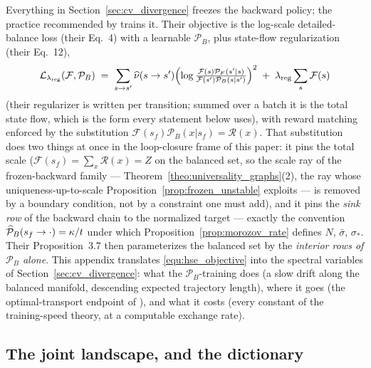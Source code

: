 \section{\appendixEtitle}\label{app:pbtrain}

Everything in Section~\ref{sec:cv_divergence} freezes the backward policy; the practice
recommended by \citet{morozov2025revisiting} trains it. Their objective is the log-scale
detailed-balance loss (their Eq.~4) with a learnable $\mathcal P_B$, plus state-flow
regularization (their Eq.~12),
\begin{equation}\label{equ:hse_objective}
    \mathcal L_{\lambda_{\mathrm{reg}}}(\mathcal F, \mathcal P_B)
    \;=\; \sum_{s\to s'} \widehat\nu(s\to s')
    \Bigl(\log\tfrac{\mathcal F(s)\mathcal P_F(s'|s)}{\mathcal F(s')\mathcal P_B(s|s')}\Bigr)^2
    \;+\; \lambda_{\mathrm{reg}}\sum_{s}\mathcal F(s)
\end{equation}
(their regularizer is written per transition; summed over a batch it is the total state
flow, which is the form every statement below uses), with reward matching enforced by
the substitution
$\mathcal F(s_f)\mathcal P_B(x|s_f)=\mathcal R(x)$. That substitution does two things at
once in the loop-closure frame of this paper: it pins the total scale ($\mathcal F(s_f) =
\sum_x\mathcal R(x) = Z$ on the balanced set, so the scale ray of the frozen-backward
family --- Theorem~\ref{theo:universality_graphs}(2), the ray whose uniqueness-up-to-scale
Proposition~\ref{prop:frozen_unstable} exploits --- is removed by a boundary condition,
not by a constraint one must add), and it pins the \emph{sink row} of the backward chain to the
normalized target --- exactly the convention
$\widehat{\mathcal P}_B(s_f\to\cdot)=\kappa/t$ under which
Proposition~\ref{prop:morozov_rate} defines $N$, $\bar\sigma$, $\sigma_*$. Their
Proposition~3.7 then parameterizes the balanced set by the \emph{interior rows of
$\mathcal P_B$ alone}. This appendix translates \eqref{equ:hse_objective} into the
spectral variables of Section~\ref{sec:cv_divergence}: what the $\mathcal P_B$-training
does (a slow drift along the balanced manifold, descending expected trajectory length),
where it goes (the optimal-transport endpoint of \citet{maksimov2026ot}), and what it
costs (every constant of the training-speed theory, at a computable exchange rate).

\subsection{The joint landscape, and the dictionary}\label{sec:joint}

